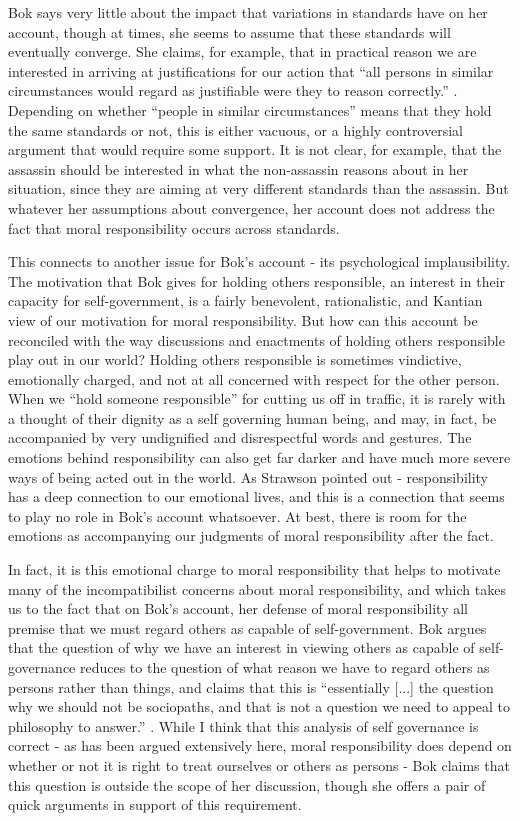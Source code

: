 \documentclass[phd,12pt,oneside,paper=letterpaper]{ubcthesis}
\begin{document}
Bok says very little about the impact that variations in standards have on her account, though at times, she seems to assume that these standards will eventually converge. She claims, for example, that in practical reason we are interested in arriving at justifications for our action that ``all persons in similar circumstances would regard as justifiable were they to reason correctly.'' \citep[p.193]{bok1998}. Depending on whether ``people in similar circumstances'' means that they hold the same standards or not, this is either vacuous, or a highly controversial argument that would require some support. It is not clear, for example, that the assassin should be interested in what the non-assassin reasons about in her situation, since they are aiming at very different standards than the assassin. But whatever her assumptions about convergence, her account does not address the fact that moral responsibility occurs across standards.

This connects to another issue for Bok's account - its psychological implausibility. The motivation that Bok gives for holding others responsible, an interest in their capacity for self-government, is a fairly benevolent, rationalistic, and Kantian view of our motivation for moral responsibility. But how can this account be reconciled with the way discussions and enactments of holding others responsible play out in our world? Holding others responsible is sometimes vindictive, emotionally charged, and not at all concerned with respect for the other person. When we ``hold someone responsible'' for cutting us off in traffic, it is rarely with a thought of their dignity as a self governing human being, and may, in fact, be accompanied by very undignified and disrespectful words and gestures. The emotions behind responsibility can also get far darker and have much more severe ways of being acted out in the world. As Strawson pointed out - responsibility has a deep connection to our emotional lives, and this is a connection that seems to play no role in Bok's account whatsoever. At best, there is room for the emotions as accompanying our judgments of moral responsibility after the fact. 

In fact, it is this emotional charge to moral responsibility that helps to motivate many of the incompatibilist concerns about moral responsibility, and which takes us to the fact that on Bok's account, her defense of moral responsibility all premise that we must regard others as capable of self-government. Bok argues that the question of why we have an interest in viewing others as capable of self-governance reduces to the question of what reason we have to regard others as persons rather than things, and claims that this is ``essentially [...] the question why we should not be sociopaths, and that is not a question we need to appeal to philosophy to answer.'' \citep[p.190]{bok1998}.  While I think that this analysis of self governance is correct - as has been argued extensively here, moral responsibility does depend on whether or not it is right to treat ourselves or others as persons - Bok claims that this question is outside the scope of her discussion, though she offers a pair of quick arguments in support of this requirement.  
\end{document}
